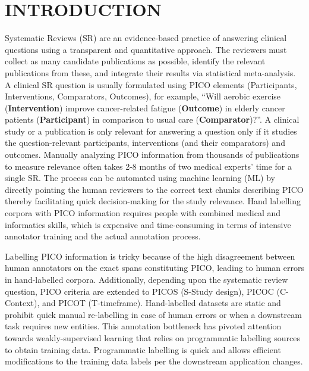 \documentclass[10.7pt,]{article}
\begin{document}
\section{\textbf{INTRODUCTION}}\label{introduction}
%
Systematic Reviews (SR) are an evidence-based practice of answering clinical questions using a transparent and quantitative approach.
The reviewers must collect as many candidate publications as possible, identify the relevant publications from these, and integrate their results via statistical meta-analysis.
A clinical SR question is usually formulated using PICO elements (Participants, Interventions, Comparators, Outcomes), for example, ``Will aerobic exercise (\textbf{Intervention}) improve cancer-related fatigue (\textbf{Outcome}) in elderly cancer patients (\textbf{Participant}) in comparison to usual care (\textbf{Comparator})?''.
A clinical study or a publication is only relevant for answering a question only if it studies the question-relevant participants, interventions (and their comparators) and outcomes.\cite{uman2011systematic} 
Manually analyzing PICO information from thousands of publications to measure relevance often takes 2-8 months of two medical experts' time for a single SR.\cite{borah2017analysis}
The process can be automated using machine learning (ML) by directly pointing the human reviewers to the correct text chunks describing PICO thereby facilitating quick decision-making for the study relevance.
Hand labelling corpora with PICO information requires people with combined medical and informatics skills, which is expensive and time-consuming in terms of intensive annotator training and the actual annotation process.

Labelling PICO information is tricky because of the high disagreement between human annotators on the exact spans constituting PICO, leading to human errors in hand-labelled corpora.\cite{brockmeier2019improving}
Additionally, depending upon the systematic review question, PICO criteria are extended to PICOS (S-Study design), PICOC (C-Context), and PICOT (T-timeframe).\cite{riva2012your,methley2014pico,uman2011systematic}
Hand-labelled datasets are static and prohibit quick manual re-labelling in case of human errors or when a downstream task requires new entities.
This annotation bottleneck has pivoted attention towards weakly-supervised learning that relies on programmatic labelling sources to obtain training data.
Programmatic labelling is quick and allows efficient modifications to the training data labels per the downstream application changes.
\end{document}

